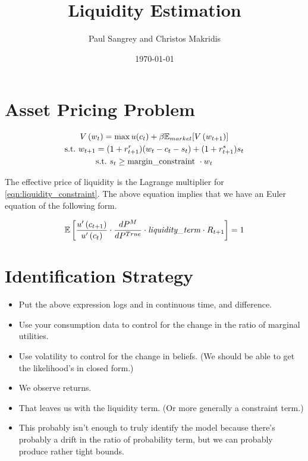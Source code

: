 \documentclass[11pt]{article}
\title{Liquidity Estimation}
\date{\today}
\author{Paul Sangrey and Christos Makridis}
\begin{document}
\maketitle 


\section{Asset Pricing Problem}


\begin{gather}
    V\left(w_t\right) = \max u(c_t) + \beta \mathbb{E}_{market}[ V\left(w_{t+1}\right)] \\
    \text{s.t.}\ w_{t+1} = (1 + r^r_{t+1}) (w_t - c_t - s_t) + (1 + r^s_{t+1}) s_t  \\
    \text{s.t.}\  s_t \geq \text{margin\_constraint}\ \cdot w_t  \label{eqn:liquidity_constraint}
\end{gather}

The effective price of liquidity is the Lagrange multiplier for \cref{eqn:liquidity_constraint}. 
The above equation implies that we have an Euler equation of the following form.

\begin{equation}
    \mathbb{E}\left[ \frac{u'\left(c_{t+1}\right)}{u'\left(c_t\right)} \cdot \frac{\mathop{}\!d P^M}{\mathop{}\!d P^{True}} \cdot 
    \text{\textit{liquidity\_term}} \cdot R_{t+1} \right] = 1 
\end{equation}


\section{Identification Strategy}



\begin{itemize}
    \item Put the above expression logs and in continuous time, and difference.
    \item Use your consumption data to control for the change in the ratio of marginal utilities.
    \item Use volatility to control for the change in beliefs. (We should be able to get the likelihood's in
        closed form.)
    \item We observe returns. 
    \item That leaves us with the liquidity term. (Or more generally a constraint term.)
    \item This probably isn't enough to truly identify the model because there's probably a drift in the ratio of
        probability term, but we can probably produce rather tight bounds.
\end{itemize}
\end{document}
